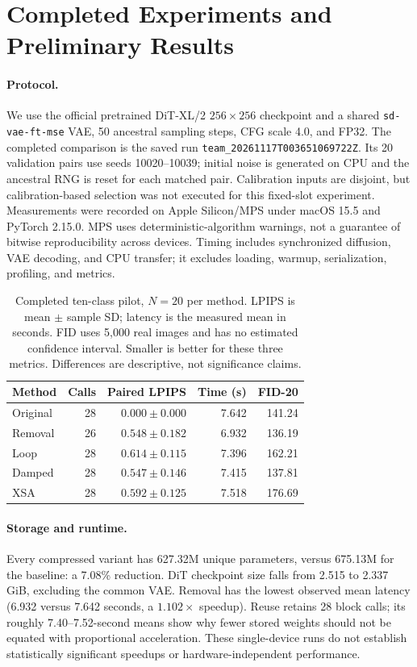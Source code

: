 \documentclass[sigconf,nonacm]{acmart}
\begin{document}
\section{Completed Experiments and Preliminary Results}
\paragraph{Protocol.}
We use the official pretrained DiT-XL/2 $256\times256$ checkpoint and a shared
\texttt{sd-vae-ft-mse} VAE, 50 ancestral sampling steps, CFG scale 4.0, and
FP32. The completed comparison is the saved run
\texttt{team\_20261117T003651069722Z}. Its 20 validation pairs use seeds
10020--10039; initial noise is generated on CPU and the ancestral RNG is reset
for each matched pair. Calibration inputs are disjoint, but calibration-based
selection was not executed for this fixed-slot experiment. Measurements were
recorded on Apple Silicon/MPS under macOS 15.5 and PyTorch 2.15.0. MPS uses
deterministic-algorithm warnings, not a guarantee of bitwise reproducibility
across devices. Timing includes synchronized diffusion, VAE decoding, and CPU
transfer; it excludes loading, warmup, serialization, profiling, and metrics.

\begin{table}[t]
\caption{Completed ten-class pilot, $N=20$ per method. LPIPS is mean $\pm$
sample SD; latency is the measured mean in seconds. FID uses 5,000 real images
and has no estimated confidence interval. Smaller is better for these three
metrics. Differences are descriptive, not significance claims.}
\label{tab:results}
\centering\small
\setlength{\tabcolsep}{3pt}
\begin{tabular}{lrrrr}
\toprule
Method & Calls & Paired LPIPS & Time (s) & FID-20\\
\midrule
Original & 28 & $0.000 \pm 0.000$ & 7.642 & 141.24 \\
Removal & 26 & $0.548 \pm 0.182$ & 6.932 & 136.19 \\
Loop & 28 & $0.614 \pm 0.115$ & 7.396 & 162.21 \\
Damped & 28 & $0.547 \pm 0.146$ & 7.415 & 137.81 \\
XSA & 28 & $0.592 \pm 0.125$ & 7.518 & 176.69 \\
\bottomrule
\end{tabular}
\end{table}

\paragraph{Storage and runtime.}
Every compressed variant has 627.32M unique parameters, versus 675.13M for
the baseline: a 7.08\% reduction. DiT checkpoint size falls from 2.515 to
2.337 GiB, excluding the common VAE. Removal has the lowest observed mean
latency (6.932 versus 7.642 seconds, a $1.102\times$ speedup). Reuse retains
28 block calls; its roughly 7.40--7.52-second means show why fewer stored
weights should not be equated with proportional acceleration. These
single-device runs do not establish statistically significant speedups or
hardware-independent performance.
\end{document}
